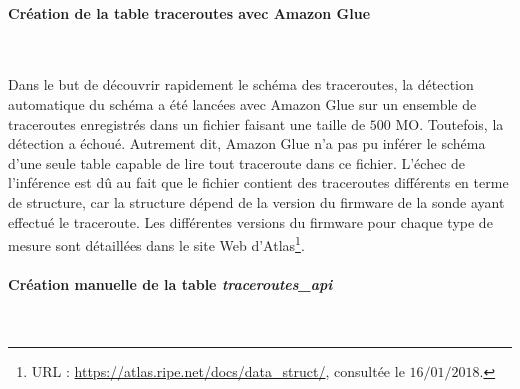 \paragraph{Création de la table traceroutes avec Amazon Glue}~

Dans le but de découvrir rapidement le schéma des traceroutes, la détection automatique du schéma a été lancées avec Amazon Glue sur un ensemble de  traceroutes enregistrés dans un fichier faisant une taille de $500$ MO. Toutefois, la détection a échoué. Autrement dit, Amazon Glue n'a pas pu inférer le schéma d'une seule table capable de lire tout traceroute dans ce fichier.  L'échec de l'inférence est dû au fait que le fichier contient des traceroutes différents en terme de structure, car la structure dépend de la version du firmware de la sonde ayant effectué le traceroute. Les différentes versions du firmware  pour chaque type de mesure sont détaillées dans le site Web d'Atlas\footnote{URL : \url{https://atlas.ripe.net/docs/data_struct/}, consultée le $16/01/2018$.}.

\paragraph{Création manuelle de la table \textit{traceroutes\_api}}~ \label{creer-table-traceroute}

